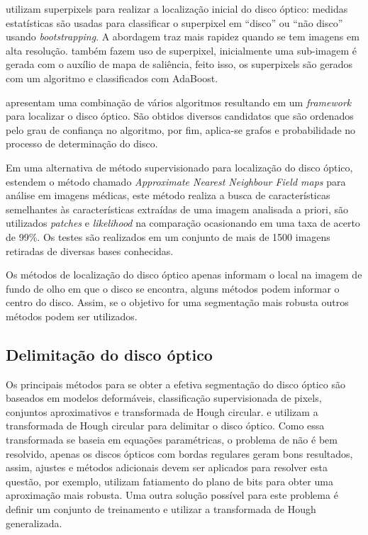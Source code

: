 utilizam superpixels para realizar a localização inicial do disco óptico: medidas estatísticas são usadas para classificar o superpixel em  ``disco'' ou ``não disco'' usando  \textit{bootstrapping}. A abordagem traz mais rapidez quando se tem imagens em alta resolução.  também fazem uso de superpixel, 
inicialmente uma sub-imagem é gerada com o auxílio de mapa de saliência, feito isso, os superpixels são gerados com um algoritmo  e classificados com AdaBoost. 

 apresentam uma combinação de vários algoritmos resultando em um \textit{framework} para localizar o disco óptico. São obtidos diversos candidatos que são ordenados pelo grau de confiança no algoritmo, por fim, aplica-se grafos e probabilidade no processo de determinação do disco.

Em uma alternativa de método supervisionado para localização do disco óptico,  estendem o método chamado \textit{Approximate Nearest Neighbour Field maps} para análise em imagens médicas, este método realiza a busca de características semelhantes às características extraídas de uma imagem analisada a priori, são utilizados \textit{patches} e \textit{likelihood} na comparação ocasionando em uma taxa de acerto  de 99\%. Os testes são realizados  em um conjunto de mais de 1500 imagens retiradas de diversas bases conhecidas.

Os métodos de localização do disco óptico apenas informam o local na imagem de fundo de olho em que o disco se encontra, alguns métodos podem informar o centro do disco. Assim, se o objetivo for uma segmentação mais robusta outros métodos podem ser utilizados.


\subsection{Delimitação do disco óptico}

Os principais métodos para se obter a efetiva segmentação do disco óptico são baseados em modelos deformáveis, classificação supervisionada de pixels,  conjuntos aproximativos e transformada de Hough circular.   e  utilizam a transformada de Hough circular para delimitar o disco óptico. Como essa transformada se baseia em equações paramétricas, o problema de  não é bem resolvido, apenas os discos ópticos com bordas regulares geram bons resultados, assim, ajustes e métodos adicionais devem ser aplicados para resolver esta questão, por exemplo,  utilizam fatiamento do plano de bits para obter uma aproximação mais robusta. Uma outra solução possível para este problema é definir um conjunto de treinamento e utilizar a transformada de Hough generalizada.
 
